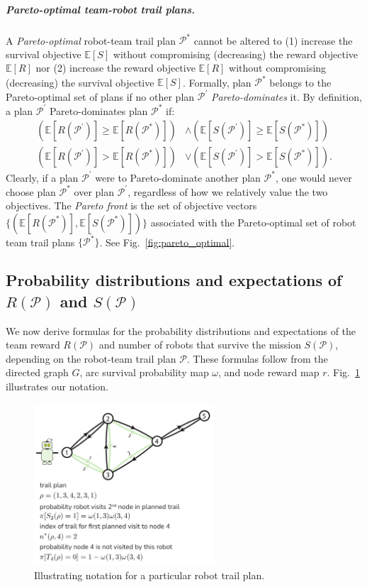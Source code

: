 \documentclass[11pt, oneside]{article}
\begin{document}
\subparagraph{Pareto-optimal team-robot trail plans.} 
A \emph{Pareto-optimal} \cite{pardalos2017non} robot-team trail plan $\mathcal{P}^*$ cannot be altered to
(1) increase the survival objective $\mathbb{E}[S]$ without compromising (decreasing) the reward objective $\mathbb{E}[R]$
nor
(2) increase the reward objective $\mathbb{E}[R]$ without compromising (decreasing) the survival objective $\mathbb{E}[S]$.
Formally, plan $\mathcal{P}^*$ belongs to the Pareto-optimal set of plans if no other plan $\mathcal{P}^\prime$ \emph{Pareto-dominates} it. By definition, a plan $\mathcal{P}^\prime$ Pareto-dominates plan $\mathcal{P}^*$ if:
\begin{align}
	\left (\mathbb{E}[R(\mathcal{P}^\prime)] \geq \mathbb{E}[R(\mathcal{P}^*)]  \right) & \wedge \left( \mathbb{E}[S(\mathcal{P}^\prime)] \geq \mathbb{E}[S(\mathcal{P}^*)] \right) \\
	\left( \mathbb{E}[R(\mathcal{P}^\prime)] > \mathbb{E}[R(\mathcal{P}^*)] \right) & \vee \left( \mathbb{E}[S(\mathcal{P}^\prime)] > \mathbb{E}[S(\mathcal{P}^*)] \right).
\end{align}
Clearly, if a plan $\mathcal{P}^\prime$ were to Pareto-dominate another plan $\mathcal{P}^*$, one would never choose plan $\mathcal{P}^*$ over plan $\mathcal{P}^\prime$, regardless of how we relatively value the two objectives. The \emph{Pareto front} is the set of objective vectors $\{(\mathbb{E}[R(\mathcal{P}^*)], \mathbb{E}[S(\mathcal{P}^*)])\}$ associated with the Pareto-optimal set of robot team trail plans $\{\mathcal{P}^*\}$. See Fig.~\ref{fig:pareto_optimal}. 

\subsection{Probability distributions and expectations of $R(\mathcal{P})$ and $S(\mathcal{P})$}
We now derive formulas for the probability distributions and expectations of the team reward $R(\mathcal{P})$ and number of robots that survive the mission $S(\mathcal{P})$, depending on the robot-team trail plan $\mathcal{P}$. 
These formulas follow from the directed graph $G$, arc survival probability map $\omega$, and node reward map $r$. Fig.~\ref{fig:notation} illustrates our notation.

\begin{figure}[h!]
    \centering
    	\includegraphics[width=0.6\textwidth]{drawings/notation_fig/notation.pdf}
    \caption{Illustrating notation for a particular robot trail plan.} \label{fig:notation}
\end{figure}
\end{document}
